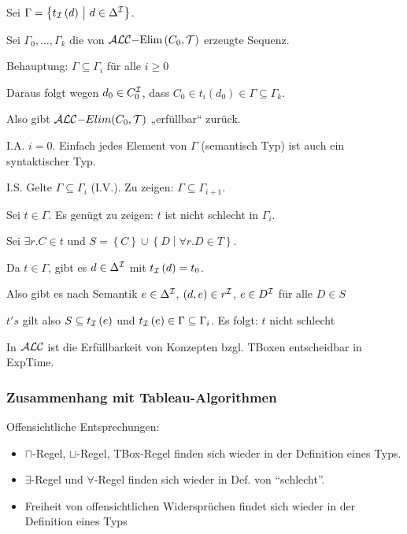 Sei $\Gamma = \left\{ t_{\mathcal{I}}\left( d \right)\  \middle| \ d \in \Delta^{\mathcal{I}} \right\}$.

Sei $\Gamma_{0},\ldots,\Gamma_{k}$ die von $\text {$\mathcal{A}\mathcal{L}\mathcal{C}$}\mathrm{-}\text{Elim}\left( C_{0},\mathcal{T} \right)$ erzeugte Sequenz. 

Behauptung: $\Gamma \subseteq \Gamma_{i}$ für alle $i \geq 0$

Daraus folgt wegen $d_{0} \in C_{0}^{\mathcal{I}}$, dass $C_{0} \in t_{i}\left( d_{0} \right) \in \Gamma \subseteq \Gamma_{k}$.

Also gibt $\text {$\mathcal{A}\mathcal{L}\mathcal{C}$}\mathrm{-}Elim(C_{0},\mathcal{T})$ „erfüllbar`` zurück.

I.A. $i = 0$. Einfach jedes Element von $\Gamma$ (semantisch Typ)
ist auch ein syntaktischer Typ.

I.S. Gelte $\Gamma \subseteq \Gamma_{i}$ (I.V.). Zu zeigen:
$\Gamma \subseteq \Gamma_{i + 1}$. 

Sei $t \in \Gamma$. Es genügt zu zeigen: $t$ ist nicht schlecht in $\Gamma_{i}$. 

Sei $\exists r.C \in t$ und $S = \left\{ C \right\} \cup \left\{ D \middle| \forall r.D \in T \right\}$.

Da $t \in \Gamma$, gibt es $d \in \Delta^{\mathcal{I}}$ mit $t_{\mathcal{I}}\left( d \right) = t_{0}$. 

Also gibt es nach Semantik $e \in \Delta^{\mathcal{I}}$, $\left( d,e \right) \in r^{\mathcal{I}}$, $e \in D^{\mathcal{I}}$ für alle $D \in S$

$t's$ gilt also $S \subseteq t_{\mathcal{I}}\left( e \right)$ und $t_{\mathcal{I}}\left( e \right) \in \Gamma \subseteq \Gamma_{i}$. Es folgt:
$t$ nicht schlecht

\begin{theorem}
In $\mathcal{A}\mathcal{L}\mathcal{C}$ ist die Erfüllbarkeit von Konzepten bzgl. TBoxen entscheidbar in ExpTime.
\end{theorem}

\subsubsection{Zusammenhang mit Tableau-Algorithmen}

Offensichtliche Entsprechungen:

\begin{itemize}
  \item $\sqcap$-Regel, $\sqcup$-Regel, TBox-Regel finden sich wieder in der Definition eines Typs.
  \item $\exists$-Regel und $\forall$-Regel finden sich wieder in Def. von \enquote{schlecht}.
  \item Freiheit von offensichtlichen Widersprüchen findet sich wieder in der Definition eines Typs
\end{itemize}

